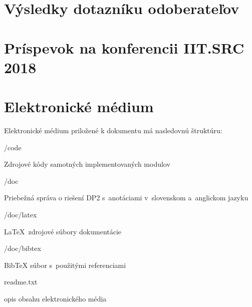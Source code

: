 \afterpage{\blankpage}
\newpage
\chapter{Výsledky dotazníku odoberateľov}
\label{appendix:survey}



\chapter{Príspevok na konferencii IIT.SRC 2018}



\afterpage{\blankpage}
\newpage
\chapter{Elektronické médium}

Elektronické médium priložené k dokumentu má nasledovnú štruktúru:
\begin{my_itemize}
\emptyitem /code
	\begin{my_itemize}
	\myitem Zdrojové kódy samotných implementovaných modulov
	\end{my_itemize}
\emptyitem /doc
	\begin{my_itemize}
	\myitem Priebežná správa o riešení DP2 s~anotáciami v~slovenskom a~anglickom jazyku
	\end{my_itemize}
\emptyitem /doc/latex
	\begin{my_itemize}
	\myitem \LaTeX~zdrojové súbory dokumentácie
	\end{my_itemize}
\emptyitem /doc/bibtex
	\begin{my_itemize}
	\myitem BibTeX súbor s~použitými referenciami
	\end{my_itemize}
\emptyitem readme.txt
  \begin{my_itemize}
  \myitem opis obsahu elektronického média
  \end{my_itemize}
\end{my_itemize}
